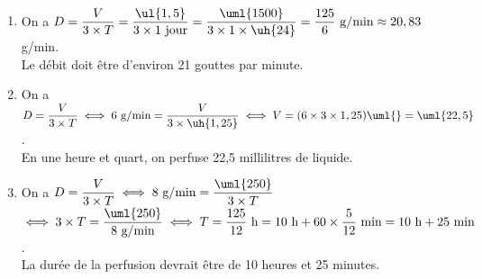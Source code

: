 \ \\ [-5mm]
   \begin{enumerate}
      \item On a $D =\dfrac{V}{3\times T} =\dfrac{\ul{1,5}}{3\times1\text{ jour}} =\dfrac{\uml{1500}}{3\times1\times\uh{24}} =\dfrac{125}{6}\text{ g/min} \approx20,83$ g/min. \\ [1mm]
         {\blue Le débit doit être d'environ 21 gouttes par minute.}
      \item On a $D =\dfrac{V}{3\times T} \iff 6\text{ g/min} =\dfrac{V}{3\times\uh{1,25}} \iff V =(6\times3\times1,25)\uml{} =\uml{22,5}$. \\ [1mm]
         {\blue En une heure et quart, on perfuse 22,5 millilitres de liquide.} \smallskip
      \item On a $D =\dfrac{V}{3\times T} \iff 8\text{ g/min} =\dfrac{\uml{250}}{3\times T}$ \\ [1mm]
         $\iff 3\times T =\dfrac{\uml{250}}{8\text{ g/min}} \iff T =\dfrac{125}{12} \text{ h} =10\text{ h}+60\times\dfrac{5}{12}\text{ min} =10\text{ h}+25\text{ min}$. \\ [1mm]
         {\blue La durée de la perfusion devrait être de 10 heures et 25 minutes}.
   \end{enumerate}
